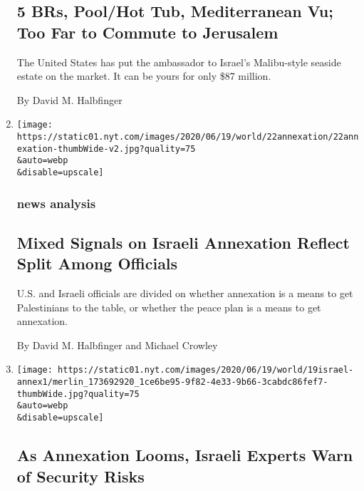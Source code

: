 \begin{enumerate}
{  \subsection{5 BRs, Pool/Hot Tub, Mediterranean Vu; Too Far to Commute
  to
  Jerusalem}\label{5-brs-poolhot-tub-mediterranean-vu-too-far-to-commute-to-jerusalem}}

  The United States has put the ambassador to Israel's Malibu-style
  seaside estate on the market. It can be yours for only \$87 million.

  By David M. Halbfinger
\item
  \href{/2020/06/22/world/middleeast/israel-annexation-trump-kushner.html}{}

  \texttt{[image: https://static01.nyt.com/images/2020/06/19/world/22annexation/22annexation-thumbWide-v2.jpg?quality=75\\\&auto=webp\\\&disable=upscale]}

  \hypertarget{news-analysis}{%
  \subsubsection{news analysis}\label{news-analysis}}

  \hypertarget{mixed-signals-on-israeli-annexation-reflect-split-among-officials}{%
  \subsection{Mixed Signals on Israeli Annexation Reflect Split Among
  Officials}\label{mixed-signals-on-israeli-annexation-reflect-split-among-officials}}

  U.S. and Israeli officials are divided on whether annexation is a
  means to get Palestinians to the table, or whether the peace plan is a
  means to get annexation.

  By David M. Halbfinger and Michael Crowley
\item
  \href{/2020/06/19/world/middleeast/isael-annexation-west-bank-risks.html}{}

  \texttt{[image: https://static01.nyt.com/images/2020/06/19/world/19israel-annex1/merlin\_173692920\_1ce6be95-9f82-4e33-9b66-3cabdc86fef7-thumbWide.jpg?quality=75\\\&auto=webp\\\&disable=upscale]}

  \hypertarget{as-annexation-looms-israeli-experts-warn-of-security-risks}{%
  \subsection{As Annexation Looms, Israeli Experts Warn of Security
  Risks}\label{as-annexation-looms-israeli-experts-warn-of-security-risks}}


\end{enumerate}
